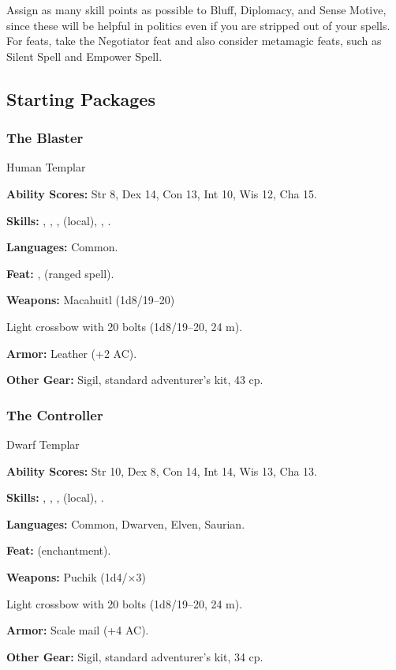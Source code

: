 Assign as many skill points as possible to Bluff, Diplomacy, and Sense Motive, since these will be helpful in politics even if you are stripped out of your spells. For feats, take the Negotiator feat and also consider metamagic feats, such as Silent Spell and Empower Spell.

\subsection{Starting Packages}
\subsubsection{The Blaster}
Human Templar

\textbf{Ability Scores:} Str 8, Dex 14, Con 13, Int 10, Wis 12, Cha 15.

\textbf{Skills:} , , ,  (local), , .

\textbf{Languages:} Common.

\textbf{Feat:} ,  (ranged spell).

\textbf{Weapons:} Macahuitl (1d8/19--20)

Light crossbow with 20 bolts (1d8/19--20, 24 m).

\textbf{Armor:} Leather (+2 AC).

\textbf{Other Gear:} Sigil, standard adventurer's kit, 43 cp.

\subsubsection{The Controller}
Dwarf Templar

\textbf{Ability Scores:} Str 10, Dex 8, Con 14, Int 14, Wis 13, Cha 13.

\textbf{Skills:} , , ,  (local), .

\textbf{Languages:} Common, Dwarven, Elven, Saurian.

\textbf{Feat:}  (enchantment).

\textbf{Weapons:} Puchik (1d4/$\times$3)

Light crossbow with 20 bolts (1d8/19--20, 24 m).

\textbf{Armor:} Scale mail (+4 AC).

\textbf{Other Gear:} Sigil, standard adventurer's kit, 34 cp.

